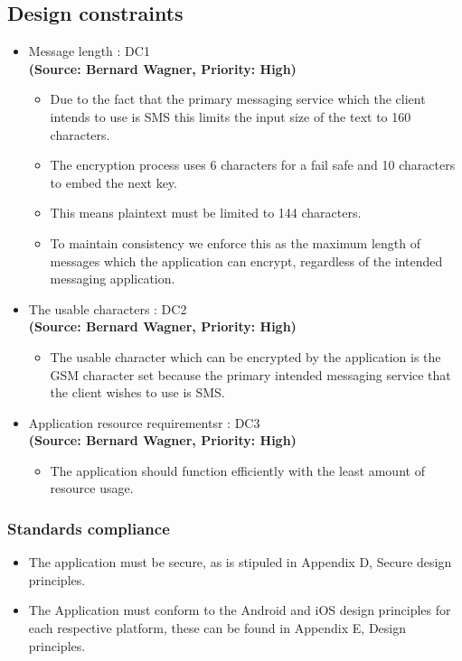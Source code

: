 \subsection{Design constraints}
\begin{itemize}
\item{Message length : DC1}\\
\textbf{(Source: Bernard Wagner, Priority: High)}
\begin{itemize}
\item Due to the fact that the primary messaging service which the client intends to use is SMS this limits the input size of the text to 160 characters. 
\item The encryption process uses 6 characters for a fail safe and 10 characters to embed the next key.
\item This means plaintext must be limited to 144 characters.
\item To maintain consistency we enforce this as the maximum length of messages which the application can encrypt, regardless of the intended messaging application.
\end{itemize}
\item{The usable characters : DC2}\\
\textbf{(Source: Bernard Wagner, Priority: High)}
\begin{itemize}
\item The usable character which can be encrypted by the application is the GSM character set because the primary intended messaging service that the client wishes to use is SMS. 
\end{itemize}
\item{Application resource requirementsr : DC3}\\
\textbf{(Source: Bernard Wagner, Priority: High)}
\begin{itemize}
\item The application should function efficiently with the least amount of resource usage.
\end{itemize}
\end{itemize}
\subsubsection{Standards compliance}
\begin{itemize}
\item The application must be secure, as is stipuled in Appendix D, Secure design principles.
\item The Application must conform to the Android and iOS design principles for each respective platform, these can be found in Appendix E, Design principles.
\end{itemize}


